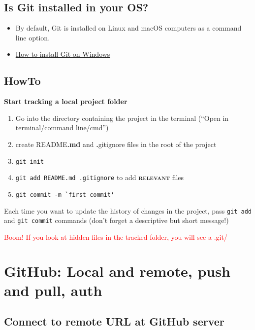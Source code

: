 \documentclass[a4paper,11pt]{article}
\makeatletter
\newcommand\HREF[2]{\hyper@linkurl{#2}{#1}}
\makeatother
\begin{document}
\subsection{Is Git installed in your OS?}

\begin{itemize}
	\item By default, Git is installed on Linux and macOS computers as a command line option.
	\item \href{https://git-scm.com/book/en/v2/Getting-Started-Installing-Git}{How to install Git on Windows}
\end{itemize}

\subsection{HowTo}

\textbf{Start tracking a \textbf{local} project folder}

\begin{enumerate}
	
	\item Go into the \HREF{./demo/}{\texttt{demo}} directory containing the project in the terminal (``Open in terminal/command line/cmd'')
	\item create README\textbf{.md} and \textbf{.}gitignore files in the root of the project
	\item \verb|git init|
	\item \verb|git add README.md .gitignore| to add \textbf{\textsc{relevant}} files
	\item \verb|git commit -m `first commit'|
\end{enumerate}

Each time you want to update the history of changes in the project, pass \verb|git add| and \verb|git commit| commands (don't forget a descriptive but short message!)

\medskip

\textcolor{red}{Boom! If you look at hidden files in the tracked folder, you will see a .git/}

\section{GitHub: Local and remote, push and pull, auth}

\subsection{Connect to remote URL at GitHub server}
\end{document}
